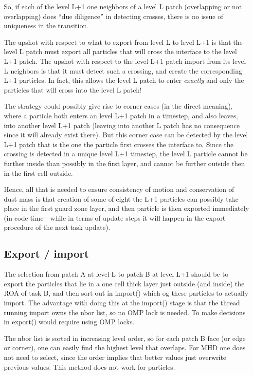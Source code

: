 \documentclass[paper=a4,fontsize=11pt]{scrartcl}
\numberwithin{equation}{section}		%
\numberwithin{figure}{section}			%
\numberwithin{table}{section}				%
\begin{document}
So, if each of the level L+1 one neighbors of a level L patch (overlapping or not overlapping) does ``due diligence'' in detecting crosses, there is no issue of uniqueness in the transition.

The upshot with respect to what to export from level L to level L+1 is that the level L patch must export all particles that will cross the interface to the level L+1 patch.  The upshot with respect to the level L+1 patch import from its level L neighbors is that it must detect such a crossing, and create the corresponding L+1 particles.  In fact, this allows the level L patch to enter \textit{exactly} and only the particles that will cross into the level L patch!

The strategy could possibly give rise to corner cases (in the direct meaning), where a particle both enters an level L+1 patch in a timestep, and also leaves, into another level L+1 patch (leaving into another L patch has no consequence since it will already exist there).  But this corner case can be detected by the level L+1 patch that is the one the particle first crosses the interface to.  Since the crossing is detected in a unique level L+1 timestep, the level L particle cannot be further inside than possibly in the first layer, and cannot be further outside then in the first cell outside.

Hence, all that is needed to ensure consistency of motion and conservation of dust mass is that creation of some of eight the L+1 particles can possibly take place in the first guard zone layer, and then particle is then exported immediately (in code time---while in terms of update steps it will happen in the export procedure of the next task update).

\subsection{Export / import}
The selection from patch A at level L to patch B at level L+1 should be to export the particles that lie in a one cell thick layer just outside (and inside) the ROA of task B, and then sort out in import() which og these particles to actually import. The advantage with doing this at the import() stage is that the thread running import owns the nbor list, so no OMP lock is needed.  To make decisions in export() would require using OMP locks.

The nbor list is sorted in increasing level order, so for each patch B face (or edge or corner), one can easily find the highest level that overlaps.  For MHD one does not need to select, since the order implies that better values just overwrite previous values.  This method does not work for particles.
\end{document}
